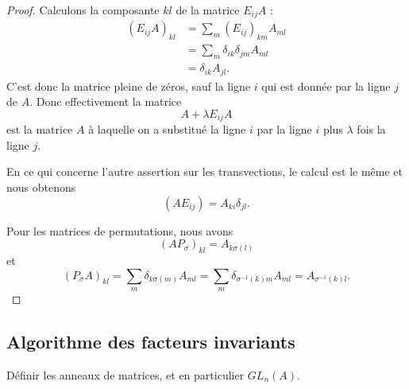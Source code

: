 \begin{proof}
    Calculons la composante \( kl\) de la matrice \( E_{ij}A\) :
    \begin{subequations}
        \begin{align}
            (E_{ij}A)_{kl}&=\sum_m(E_{ij})_{km}A_{ml}\\
            &=\sum_m\delta_{ik}\delta_{jm}A_{ml}\\
            &=\delta_{ik}A_{jl}.
        \end{align}
    \end{subequations}
    C'est donc la matrice pleine de zéros, sauf la ligne \( i\) qui est donnée par la ligne \( j\) de \( A\). Donc effectivement la matrice
    \begin{equation}
        A+\lambda E_{ij}A
    \end{equation}
    est la matrice \( A\) à laquelle on a substitué la ligne \( i\) par la ligne \( i\) plus \( \lambda\) fois la ligne \( j\).

    En ce qui concerne l'autre assertion sur les transvections, le calcul est le même et nous obtenons
    \begin{equation}
        (AE_{ij})=A_{ki}\delta_{jl}.
    \end{equation}

    Pour les matrices de permutations, nous avons 
    \begin{equation}
        (AP_{\sigma})_{kl}=A_{k\sigma(l)}
    \end{equation}
    et
    \begin{equation}
        (P_{\sigma}A)_{kl}=\sum_m\delta_{k\sigma(m)}A_{ml}=\sum_m\delta_{\sigma^{-1}(k)m}A_{ml}=A_{\sigma^{-1}(k)l}.
    \end{equation}
\end{proof}


\subsection{Algorithme des facteurs invariants}

\begin{probleme}
Définir les anneaux de matrices, et en particulier \(GL_n(A) \).
\end{probleme}

